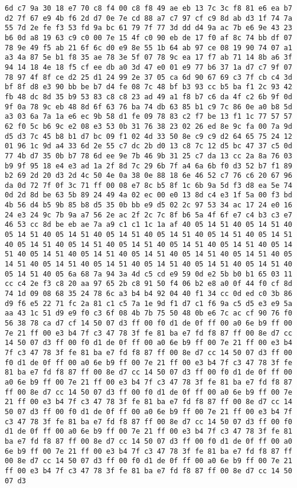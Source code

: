 \documentclass{article}
\begin{document}
\begin{verbatim}
6d c7 9a 30 18 e7 70 c8 f4 00 c8 f8 49 ae eb 13 7c 3c f8 81 e6 ea b7 d2 7f 67 e9 4b f6 2d d7 0e 7e cd 88 a7 c7 97 cf c9 8d ab d3 1f 74 7a 55 7d 2e fe f3 53 fd 9a bc 61 79 7f 77 3d dd d4 9a ac 7b e6 9e 43 23 b6 0d a8 19 63 c9 c0 00 7e 15 4f c0 90 eb de 17 f0 af 8c 74 bb df 07 78 9e 49 f5 ab 21 6f 6c d0 e9 8e 55 1b 64 ab 97 ce 08 19 90 74 07 a1 a3 4a 87 5e b1 f8 35 ae 78 3e 5f 07 78 9c ea 17 f7 ab 71 14 8b a6 3f 94 14 18 4e 18 f5 cf ee db a0 3d 47 e0 01 e9 77 b6 37 1a d7 c7 9f 07 78 97 4f 8f ce d2 25 d1 24 99 2e 37 05 ca 6d 90 67 69 c3 7f cb c4 3d bf 8f d8 e3 90 bb be b7 d4 fe 08 7c 48 bf b3 93 cc b5 ba f1 2c 93 42 fb 48 dc 8d 35 b9 53 83 c8 c8 23 ad 49 a1 f8 b7 c6 da 4f c2 6b 9f 0d 9f 0a 78 9c eb 48 8d 6f 63 76 ba 74 db 63 85 b1 c9 7c 86 0e a0 b8 5d a3 03 6a 7a 1a e6 ec 9b 58 d1 fe 09 78 83 c2 f7 be 13 f1 1c 77 57 57 62 f0 5c b6 9c e2 08 e3 53 0b 31 76 38 23 02 26 ed 8e 9c fa 00 7a 9d d5 d3 7c 45 b8 b1 d7 bc 09 f1 02 4d 33 50 8e c9 c9 d2 64 65 75 24 12 01 96 1c 9d a4 33 6d 2e 55 c7 dc 2b d0 13 c8 7c 12 d5 bc 47 37 c5 0d 77 4b d7 35 0b b7 78 6d ee 9e 7b 46 9b 31 25 c7 da 13 cc 2a 8a 76 03 b9 9f 95 18 e4 e3 ad 1a 2f 8d 7c 29 6b 7f a4 6a 6b f0 d3 52 b7 f1 89 b2 69 2d 20 d3 2d 4c 50 4e 0a 38 0e 88 18 6e 46 52 c7 76 c6 20 67 96 da 0d 72 7f 0f 3c 71 ff 00 08 e7 8c b5 8f 1c 6b 9a 5d f3 d8 ea 5e 74 0d 2d 8d be 63 5b 89 24 49 4a 02 ec 00 e0 13 8d c4 e3 1f 5a 00 f3 bd 4b 56 d4 b5 9b 85 b8 d5 35 0b bb e9 d5 02 2c 97 53 34 ac 17 24 e0 16 24 e3 24 9c 7b 9a a7 56 2e ac 2f 2c 7c 8f b6 5a 4f 6f e7 c4 b3 c3 e7 46 53 cc 8d be eb ae 7a a9 c1 c1 1c 1a af 40 05 14 51 40 05 14 51 40 05 14 51 40 05 14 51 40 05 14 51 40 05 14 51 40 05 14 51 40 05 14 51 40 05 14 51 40 05 14 51 40 05 14 51 40 05 14 51 40 05 14 51 40 05 14 51 40 05 14 51 40 05 14 51 40 05 14 51 40 05 14 51 40 05 14 51 40 05 14 51 40 05 14 51 40 05 14 51 40 05 14 51 40 05 14 51 40 05 14 51 40 05 14 51 40 05 6a 68 7a 94 3a 4d c5 cd e9 59 0d e2 5b b0 b1 65 03 11 cc c4 2e f3 c8 20 aa 97 65 2b c8 91 50 f4 06 b2 e8 a0 0f 44 f0 cf 8d 74 1d 09 08 68 35 24 78 6c a3 b4 b4 92 04 40 f1 34 cc 0d ed c0 3b 86 d9 f6 e5 22 71 fc 2a 81 c1 c5 7a 1e 9d f1 d7 c1 f6 9a c5 d5 e3 e9 5a aa 43 1c 51 d9 e9 f0 c3 6f 08 4b 7b 75 50 48 0b e6 7c ac cf 90 76 f0 56 38 78 ca d7 cf 14 50 07 d3 ff 00 f0 d1 de 0f ff 00 a0 6e b9 ff 00 7e 21 ff 00 e3 b4 7f c3 47 78 3f fe 81 ba e7 fd f8 87 ff 00 8e d7 cc 14 50 07 d3 ff 00 f0 d1 de 0f ff 00 a0 6e b9 ff 00 7e 21 ff 00 e3 b4 7f c3 47 78 3f fe 81 ba e7 fd f8 87 ff 00 8e d7 cc 14 50 07 d3 ff 00 f0 d1 de 0f ff 00 a0 6e b9 ff 00 7e 21 ff 00 e3 b4 7f c3 47 78 3f fe 81 ba e7 fd f8 87 ff 00 8e d7 cc 14 50 07 d3 ff 00 f0 d1 de 0f ff 00 a0 6e b9 ff 00 7e 21 ff 00 e3 b4 7f c3 47 78 3f fe 81 ba e7 fd f8 87 ff 00 8e d7 cc 14 50 07 d3 ff 00 f0 d1 de 0f ff 00 a0 6e b9 ff 00 7e 21 ff 00 e3 b4 7f c3 47 78 3f fe 81 ba e7 fd f8 87 ff 00 8e d7 cc 14 50 07 d3 ff 00 f0 d1 de 0f ff 00 a0 6e b9 ff 00 7e 21 ff 00 e3 b4 7f c3 47 78 3f fe 81 ba e7 fd f8 87 ff 00 8e d7 cc 14 50 07 d3 ff 00 f0 d1 de 0f ff 00 a0 6e b9 ff 00 7e 21 ff 00 e3 b4 7f c3 47 78 3f fe 81 ba e7 fd f8 87 ff 00 8e d7 cc 14 50 07 d3 ff 00 f0 d1 de 0f ff 00 a0 6e b9 ff 00 7e 21 ff 00 e3 b4 7f c3 47 78 3f fe 81 ba e7 fd f8 87 ff 00 8e d7 cc 14 50 07 d3 ff 00 f0 d1 de 0f ff 00 a0 6e b9 ff 00 7e 21 ff 00 e3 b4 7f c3 47 78 3f fe 81 ba e7 fd f8 87 ff 00 8e d7 cc 14 50 07 d3 
\end{verbatim}
\end{document}
